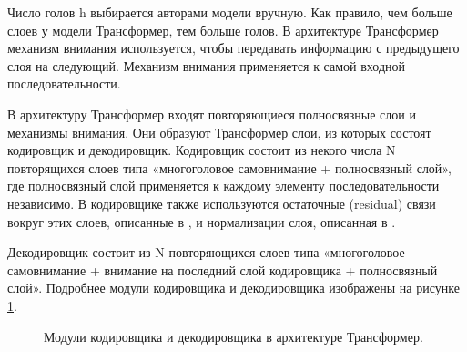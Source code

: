 Число голов h выбирается авторами модели вручную. Как правило, чем больше слоев у модели Трансформер, тем больше голов. 
В архитектуре Трансформер механизм внимания используется, чтобы передавать информацию с предыдущего слоя на следующий. Механизм внимания применяется к самой входной последовательности.


В архитектуру Трансформер входят повторяющиеся полносвязные слои и механизмы внимания. Они образуют Трансформер слои, из которых состоят кодировщик и декодировщик. Кодировщик состоит из некого числа N повторящихся слоев типа «многоголовое самовнимание + полносвязный слой», где полносвязный слой применяется к каждому элементу последовательности независимо. В кодировщике также используются остаточные (residual) связи вокруг этих слоев, описанные в \cite{he_2016}, и нормализации слоя, описанная в \cite{ba_2016}.

Декодировщик состоит из N повторяющихся слоев типа «многоголовое самовнимание + внимание на последний слой кодировщика + полносвязный слой». 
 Подробнее модули кодировщика и декодировщика изображены на рисунке \ref{fig:Transformer4-EncoderDecoder}. 

\begin{figure}[ht]
  \caption{Модули кодировщика и декодировщика в архитектуре Трансформер.}\label{fig:Transformer4-EncoderDecoder}
\end{figure}

